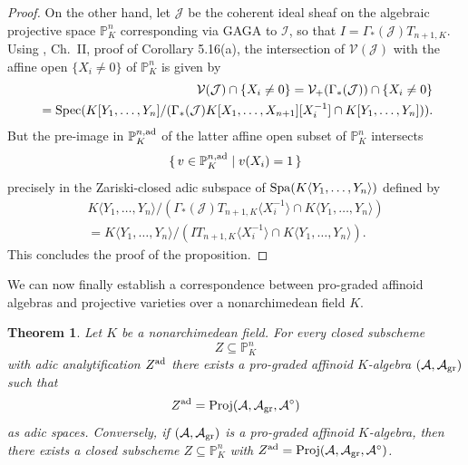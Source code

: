 \documentclass[12pt,twoside,a4paper]{article}
\newtheorem{thm}{Theorem}[section]
\theoremstyle{definition}
\theoremstyle{remark}
\newcommand\ad{{\rm ad}}
\newcommand\gr{{\rm gr}}
\newcommand\Proj{{\rm Proj}}
\newcommand\Spa{{\rm Spa}}
\newcommand\Spec{{\rm Spec}}
\begin{document}
\begin{proof}
On the other hand, let $\mathcal{J}$ be the coherent ideal sheaf on the algebraic projective space $\mathbb{P}_{K}^{n}$ corresponding via GAGA to $\mathcal{I}$, so that $I=\Gamma_{\ast}(\mathcal{J})T_{n+1, K}$. Using \cite{Hartshorne}, Ch.~II, proof of Corollary 5.16(a), the intersection of $\mathcal{V}(\mathcal{J})$ with the affine open $\{X_{i}\neq 0\}$ of $\mathbb{P}_{K}^{n}$ is given by \begin{align*}\mathcal{V}(\mathcal{J})\cap \{X_{i}\neq 0\}=\mathcal{V}_{+}(\Gamma_{\ast}(\mathcal{J}))\cap \{X_{i}\neq 0\} \\ =\Spec(K[Y_1,\dots, Y_n]/(\Gamma_{\ast}(\mathcal{J})K[X_1,\dots, X_{n+1}][X_{i}^{-1}]\cap K[Y_1,\dots, Y_n])).\end{align*}But the pre-image in $\mathbb{P}_{K}^{n,\ad}$ of the latter affine open subset of $\mathbb{P}_{K}^{n}$ intersects \begin{equation*}\{\, v\in\mathbb{P}_{K}^{n,\ad}\mid v(X_{i})=1\,\}\end{equation*}precisely in the Zariski-closed adic subspace of $\Spa(K\langle Y_1,\dots, Y_n\rangle)$ defined by \begin{align*}K\langle Y_1,\dots, Y_n\rangle/(\Gamma_{\ast}(\mathcal{J})T_{n+1, K}\langle X_{i}^{-1}\rangle\cap K\langle Y_1,\dots, Y_n\rangle) \\ =K\langle Y_1,\dots, Y_n\rangle/(IT_{n+1, K}\langle X_{i}^{-1}\rangle\cap K\langle Y_1,\dots, Y_n\rangle).\end{align*}This concludes the proof of the proposition.\end{proof}
We can now finally establish a correspondence between pro-graded affinoid algebras and projective varieties over a nonarchimedean field $K$.
\begin{thm}\label{Graded GAGA}Let $K$ be a nonarchimedean field. For every closed subscheme \begin{equation*}Z\subseteq \mathbb{P}_{K}^{n}\end{equation*}with adic analytification $Z^{\ad}$ there exists a pro-graded affinoid $K$-algebra $(\mathcal{A}, \mathcal{A}_{\gr})$ such that \begin{equation*}Z^{\ad}=\Proj(\mathcal{A}, \mathcal{A}_{\gr}, \mathcal{A}^{\circ})\end{equation*}as adic spaces. Conversely, if $(\mathcal{A}, \mathcal{A}_{\gr})$ is a pro-graded affinoid $K$-algebra, then there exists a closed subscheme $Z\subseteq \mathbb{P}_{K}^{n}$ with $Z^{\ad}=\Proj(\mathcal{A}, \mathcal{A}_{\gr}, \mathcal{A}^{\circ})$. \end{thm}
\end{document}

